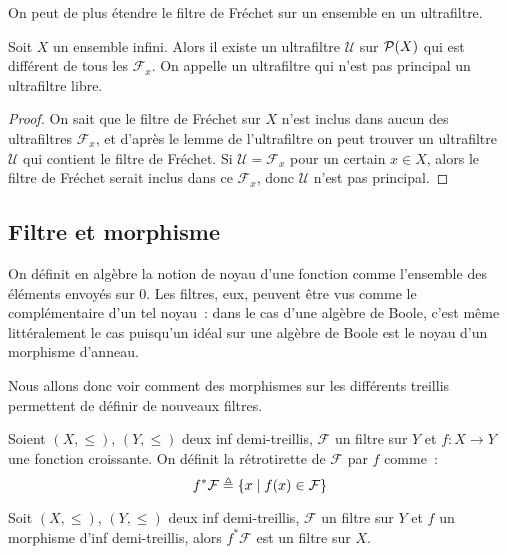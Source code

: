 On peut de plus étendre le filtre de Fréchet sur un ensemble en un ultrafiltre.

\begin{proposition}
  Soit $X$ un ensemble infini. Alors il existe un ultrafiltre $\mathcal U$ sur
  $\mathcal{P}(X)$ qui est différent de tous les $\mathcal F_x$. On appelle un
  ultrafiltre qui n'est pas principal un ultrafiltre libre.
\end{proposition}

\begin{proof}
  On sait que le filtre de Fréchet sur $X$ n'est inclus dans aucun des
  ultrafiltres $\mathcal F_x$, et d'après le lemme de l'ultrafiltre on peut
  trouver un ultrafiltre $\mathcal U$ qui contient le filtre de Fréchet. Si
  $\mathcal U = \mathcal F_x$ pour un certain $x\in X$, alors le filtre de
  Fréchet serait inclus dans ce $\mathcal F_x$, donc $\mathcal U$ n'est pas
  principal.
\end{proof}

\subsection{Filtre et morphisme}

On définit en algèbre la notion de noyau d'une fonction comme l'ensemble des
éléments envoyés sur $0$. Les filtres, eux, peuvent être vus comme le
complémentaire d'un tel noyau~: dans le cas d'une algèbre de Boole, c'est même
littéralement le cas puisqu'un idéal sur une algèbre de Boole est le noyau d'un
morphisme d'anneau.

Nous allons donc voir comment des morphismes sur les différents treillis
permettent de définir de nouveaux filtres.

\begin{definition}
  Soient $(X,\leq)$, $(Y,\leq)$ deux inf demi-treillis, $\mathcal F$ un filtre
  sur $Y$ et $f : X \to Y$ une fonction croissante. On définit la rétrotirette
  de $\mathcal F$ par $f$ comme~:
  \[f^* \mathcal F \triangleq \{x\mid f(x) \in \mathcal F\}\]
\end{definition}

\begin{property}
  Soit $(X,\leq)$, $(Y,\leq)$ deux inf demi-treillis, $\mathcal F$ un filtre
  sur $Y$ et $f$ un morphisme d'inf demi-treillis, alors $f^*\mathcal F$ est un
  filtre sur $X$.
\end{property}

